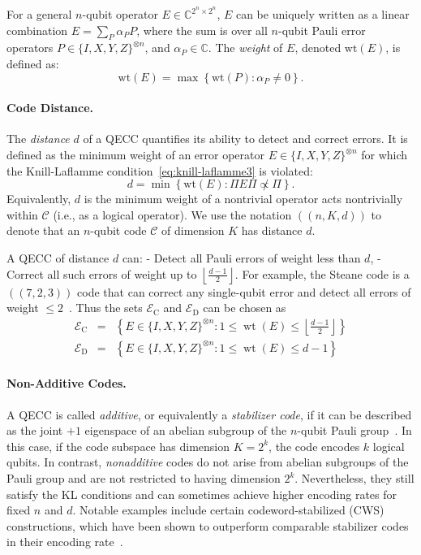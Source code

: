 \documentclass[8pt]{article}
\theoremstyle{definition}
\newcommand{\code}{\mathcal{C}}
\newcommand{\proj}{\Pi}
\newcommand{\ecset}{\mathcal{E}_\textrm{C}}
\newcommand{\edset}{\mathcal{E}_\textrm{D}}
\begin{document}
For a general $n$-qubit operator \(E \in \mathbb{C}^{2^n \times 2^n}\), \(E\) can be uniquely written as a linear combination \(E = \sum_{P} \alpha_P P\),
where the sum is over all \(n\)-qubit Pauli error operators \(P \in \{I, X, Y, Z\}^{\otimes n}\), and \(\alpha_P \in \mathbb{C}\). The \emph{weight} of \(E\), denoted \(\mathrm{wt}(E)\), is defined as:
\[
    \mathrm{wt}(E) = \max \left\{ \mathrm{wt}(P) : \alpha_P \ne 0 \right\}.
\]

\paragraph{Code Distance.}
The \emph{distance} \(d\) of a QECC quantifies its ability to detect and correct errors. It is defined as the minimum weight of an error operator \(E \in \{I, X, Y, Z\}^{\otimes n}\) for which the Knill-Laflamme condition~\eqref{eq:knill-laflamme3} is violated:
\[
    d = \min \left\{ \mathrm{wt}(E) : \proj E \proj \not\propto \proj \right\}.
\]
Equivalently, \(d\) is the minimum weight of a nontrivial operator acts nontrivially within \(\code\) (i.e., as a logical operator).
We use the notation $((n,K,d))$ to denote that an $n$-qubit code $\code$ of dimension $K$ has distance $d$.

A QECC of distance \(d\) can:
- Detect all Pauli errors of weight less than \(d\),
- Correct all such errors of weight up to \(\left\lfloor \frac{d - 1}{2} \right\rfloor\).
For example, the Steane code is a \(((7, 2, 3))\) code that can correct any single-qubit error and detect all errors of weight $\le 2$~\cite{steane1996error}.
Thus the sets $\ecset$ and $\edset$ can be chosen as
\begin{eqnarray*}
    \ecset &=& \left\{ E \in \{I,X,Y,Z\}^{\otimes n}: 1\le \operatorname{wt}(E) \le \left\lfloor \frac{d-1}{2} \right\rfloor\right\}\\
    \edset &=& \left\{ E \in \{I,X,Y,Z\}^{\otimes n}: 1\le \operatorname{wt}(E) \le d-1\right\}
\end{eqnarray*}

\paragraph{Non-Additive Codes.}  A QECC is called \emph{additive}, or equivalently a \emph{stabilizer code}, if it can be described as the joint \(+1\) eigenspace of an abelian subgroup of the \(n\)-qubit Pauli group~\cite{gottesman1997stabilizer}. In this case, if the code subspace has dimension \(K = 2^k\), the code encodes \(k\) logical qubits. In contrast, \emph{nonadditive} codes do not arise from abelian subgroups of the Pauli group and are not restricted to having dimension \(2^k\). Nevertheless, they still satisfy the KL conditions and can sometimes achieve higher encoding rates for fixed \(n\) and \(d\). Notable examples include certain codeword-stabilized (CWS) constructions, which have been shown to outperform comparable stabilizer codes in their encoding rate~\cite{rains1997nonadditive,     yu2007graphical,yu2008nonadditive,cross2009codeword}.
\end{document}
